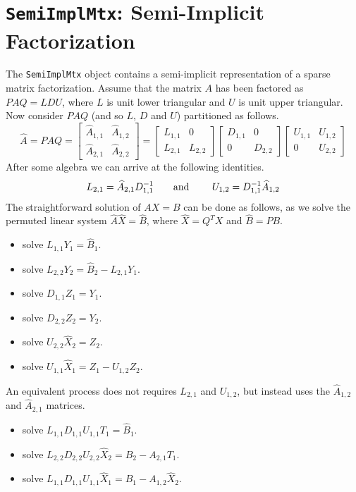 \chapter{{\tt SemiImplMtx}: Semi-Implicit Factorization}
\label{chapter:SemiImplMtx}
\par
The {\tt SemiImplMtx} object contains a semi-implicit
representation of a sparse matrix factorization.
Assume that the matrix $A$ has been factored as
$PAQ = LDU$, where $L$ is unit lower triangular
and $U$ is unit upper triangular.
Now consider $PAQ$ (and so $L$, $D$ and $U$) partitioned as
follows.
$$
{\widehat A} = PAQ =
\begin{bmatrix}
{\widehat A}_{1,1} & {\widehat A}_{1,2} \\
{\widehat A}_{2,1} & {\widehat A}_{2,2}
\end{bmatrix}
=
\begin{bmatrix}
L_{1,1} &   0     \\
L_{2,1} & L_{2,2}
\end{bmatrix}
\begin{bmatrix}
D_{1,1} &    0    \\
   0    & D_{2,2}
\end{bmatrix}
\begin{bmatrix}
U_{1,1} & U_{1,2} \\
   0    & U_{2,2}
\end{bmatrix}
$$
After some algebra we can arrive at the following identities.
$$
L_{2,1} = {\widehat A}_{2,1} D_{1,1}^{-1}
\text{\qquad and \qquad}
U_{1,2} = D_{1,1}^{-1} {\widehat A}_{1,2} 
$$
The straightforward solution of $AX = B$ can be done as follows,
as we solve the permuted linear system
${\widehat A} {\widehat X} = {\widehat B}$,
where ${\widehat X} = Q^T X$ and ${\widehat B} = P B$.
\begin{itemize}
\item solve $L_{1,1} Y_1 = {\widehat B}_1$.
\item solve $L_{2,2} Y_2 = {\widehat B}_2 - L_{2,1} Y_1$.
\item solve $D_{1,1} Z_1 = Y_1$.
\item solve $D_{2,2} Z_2 = Y_2$.
\item solve $U_{2,2} {\widehat X}_2 = Z_2$.
\item solve $U_{1,1} {\widehat X}_1 = Z_1 - U_{1,2} Z_2$.
\end{itemize}
An equivalent process does not requires $L_{2,1}$ and $U_{1,2}$,
but instead uses the ${\widehat A}_{1,2}$ and ${\widehat A}_{2,1}$
matrices.
\begin{itemize}
\item 
solve $L_{1,1} D_{1,1} U_{1,1} T_1 = {\widehat B}_1$.
\item 
solve $L_{2,2} D_{2,2} U_{2,2} {\widehat X}_2 = {\widehat B}_2 - A_{2,1} T_1$.
\item 
solve $L_{1,1} D_{1,1} U_{1,1} {\widehat X}_1 
       = {\widehat B}_1 - A_{1,2} {\widehat X}_2$.
\end{itemize}
